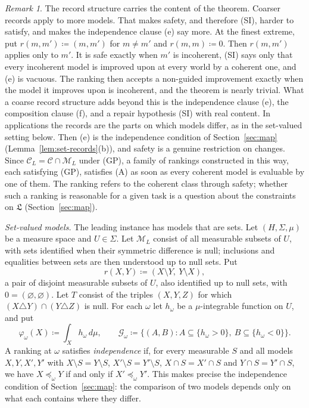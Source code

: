 \documentclass[11pt]{article}
\theoremstyle{definition}
\theoremstyle{remark}
\newtheorem{remark}[theorem]{Remark}
\newcommand{\M}{\mathcal M}
\newcommand{\C}{\mathcal C}
\newcommand{\G}{\mathcal G}
\begin{document}
\begin{remark}\label{rem:safe-records}
The record structure carries the content of the theorem. Coarser records apply to more models. That makes safety, and therefore (SI), harder to satisfy, and makes the independence clause (e) say more. At the finest extreme, put $r(m,m')\coloneqq(m,m')$ for $m\ne m'$ and $r(m,m)\coloneqq0$. Then $r(m,m')$ applies only to $m'$. It is safe exactly when $m'$ is incoherent, (SI) says only that every incoherent model is improved upon at every world by a coherent one, and (e) is vacuous. The ranking then accepts a non-guided improvement exactly when the model it improves upon is incoherent, and the theorem is nearly trivial. What a coarse record structure adds beyond this is the independence clause (e), the composition clause (f), and a repair hypothesis (SI) with real content. In applications the records are the parts on which models differ, as in the set-valued setting below. Then (e) is the independence condition of Section~\ref{sec:map} (Lemma~\ref{lem:set-records}(b)), and safety is a genuine restriction on changes. Since $\C_L=\C\cap\M_L$ under (GP), a family of rankings constructed in this way, each satisfying (GP), satisfies (A) as soon as every coherent model is evaluable by one of them. The ranking refers to the coherent class through safety; whether such a ranking is reasonable for a given task is a question about the constraints on $\mathfrak L$ (Section~\ref{sec:map}).
\end{remark}

\emph{Set-valued models.} The leading instance has models that are sets. Let $(H,\Sigma,\mu)$ be a measure space and $U\in\Sigma$. Let $\M_L$ consist of all measurable subsets of $U$, with sets identified when their symmetric difference is null; inclusions and equalities between sets are then understood up to null sets. Put
\[
 r(X,Y)\coloneqq(X\setminus Y,\ Y\setminus X),
\]
a pair of disjoint measurable subsets of $U$, also identified up to null sets, with $0=(\varnothing,\varnothing)$. Let $T$ consist of the triples $(X,Y,Z)$ for which $(X\triangle Y)\cap(Y\triangle Z)$ is null. For each $\omega$ let $h_\omega$ be a $\mu$-integrable function on $U$, and put
\[
 \varphi_\omega(X)\coloneqq\int_X h_\omega\,d\mu,\qquad
 \G_\omega\coloneqq\{(A,B):A\subseteq\{h_\omega>0\},\ B\subseteq\{h_\omega<0\}\}.
\]
A ranking at $\omega$ satisfies \emph{independence} if, for every measurable $S$ and all models $X,Y,X',Y'$ with $X\setminus S=Y\setminus S$, $X'\setminus S=Y'\setminus S$, $X\cap S=X'\cap S$ and $Y\cap S=Y'\cap S$, we have $X\preceq_\omega Y$ if and only if $X'\preceq_\omega Y'$. This makes precise the independence condition of Section~\ref{sec:map}: the comparison of two models depends only on what each contains where they differ.
\end{document}
